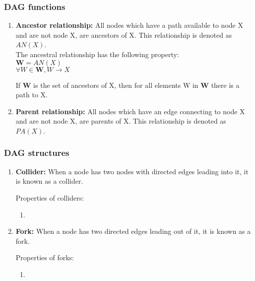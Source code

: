 \documentclass[11pt]{article}
\begin{document}
\subsubsection{DAG functions}
\begin{enumerate}    
    
    \item \textbf{Ancestor relationship:}
    All nodes which have a path available to node X and are not node X, are ancestors of X.
    This relationship is denoted as $AN(X)$.\\
    
    The ancestral relationship has the following property:\\
    $\textbf{W} = AN(X)$\\
    $\forall W \in \textbf{W}, W \to X$
    
    If \textbf{W} is the set of ancestors of X, then for all elements W in \textbf{W} there is a path to X.\\
    
    
    \item \textbf{Parent relationship:}
    All nodes which have an edge connecting to node X and are not node X, are parents of X.
    This relationship is denoted as $PA(X)$.\\

\end{enumerate}
   
\subsubsection{DAG structures}
\begin{enumerate}
     \item \textbf{Collider:}
    When a node has two nodes with directed edges leading into it, it is known as a collider.
    
    Properties of colliders:
    \begin{enumerate}
        \item
    \end{enumerate}
    
    \item \textbf{Fork:}
    When a node has two directed edges leading out of it, it is known as a fork.
    
    Properties of forks:
    \begin{enumerate}
        \item
    \end{enumerate}
\end{enumerate}
\end{document}
